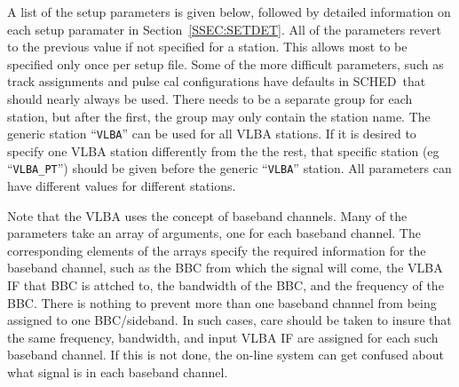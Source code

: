 \documentclass{report}
\newcommand{\schedb}{{\sc SCHED~}}
\begin{document}
A list of the setup parameters is given below, followed by detailed
information on each setup paramater in Section~\ref{SSEC:SETDET}. All
of the parameters revert to the previous value if not specified for a
station. This allows most to be specified only once per setup file.
Some of the more difficult parameters, such as track assignments and
pulse cal configurations have defaults in \schedb that should
nearly always be used.  There needs to be a separate group for each
station, but after the first, the group may only contain the station
name.  The generic station ``{\tt VLBA}'' can be used for all VLBA
stations.  If it is desired to specify one VLBA station differently
from the the rest, that specific station (eg ``{\tt VLBA\_PT}'')
should be given before the generic ``{\tt VLBA}'' station.  All
parameters can have different values for different stations.

Note that the VLBA uses the concept of baseband channels.  Many of the
parameters take an array of arguments, one for each baseband
channel. The corresponding elements of the arrays specify the required
information for the baseband channel, such as the BBC from which the
signal will come, the VLBA IF that BBC is attched to, the bandwidth of
the BBC, and the frequency of the BBC. There is nothing to prevent
more than one baseband channel from being assigned to one
BBC/sideband. In such cases, care should be taken to insure that the
same frequency, bandwidth, and input VLBA IF are assigned for each
such baseband channel. If this is not done, the on-line system can get
confused about what signal is in each baseband channel.
\end{document}
